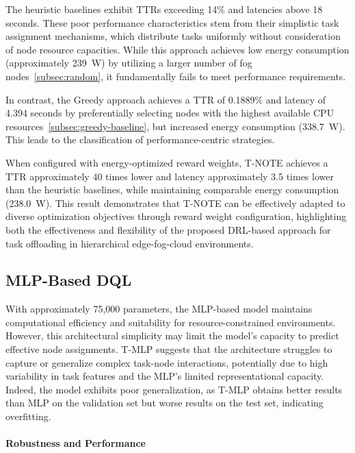 \documentclass[preprint,3p,authoryear]{elsarticle}
\begin{document}
The heuristic baselines exhibit TTRs exceeding 14\% and latencies above 18 seconds. These poor performance characteristics stem from their simplistic task assignment mechanisms, which distribute tasks uniformly without consideration of node resource capacities. While this approach achieves low energy consumption (approximately 239~W) by utilizing a larger number of fog nodes~\ref{subsec:random}, it fundamentally fails to meet performance requirements.

In contrast, the Greedy approach achieves a TTR of 0.1889\% and latency of 4.394 seconds by preferentially selecting nodes with the highest available CPU resources~\ref{subsec:greedy-baseline}, but increased energy consumption (338.7~W). This leads to the classification of performance-centric strategies.

When configured with energy-optimized reward weights, T-NOTE achieves a TTR approximately 40 times lower and latency approximately 3.5 times lower than the heuristic baselines, while maintaining comparable energy consumption (238.0~W). This result demonstrates that T-NOTE can be effectively adapted to diverse optimization objectives through reward weight configuration, highlighting both the effectiveness and flexibility of the proposed DRL-based approach for task offloading in hierarchical edge-fog-cloud environments.



\subsection{MLP-Based DQL}\label{subsec:mlp_perf}

With approximately 75,000 parameters, the MLP-based model maintains computational efficiency and suitability for resource-constrained environments. However, this architectural simplicity may limit the model's capacity to predict effective node assignments. T-MLP suggests that the architecture struggles to capture or generalize complex task-node interactions, potentially due to high variability in task features and the MLP's limited representational capacity. Indeed, the model exhibits poor generalization, as T-MLP obtains better results than MLP on the validation set but worse results on the test set, indicating overfitting.

\paragraph{Robustness and Performance}
\end{document}
